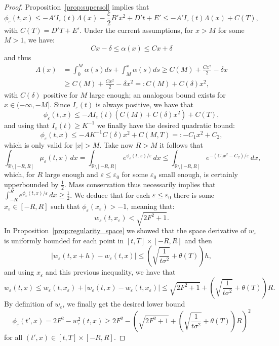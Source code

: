 \documentclass[onefignum,onetabnum]{siamart190516}
\newcommand{\R}{\mathbb{R}}
\newcommand{\1}{\mathbbm{1}}
\newcommand{\eps}{\varepsilon}
\begin{document}
\begin{proof}
Proposition~\ref{prop:supersol} implies that
$$
\phi_\eps(t,x)\leq -A'I_\eps(t)\Lambda(x)-\frac{\eps}{2}B'x^2+D't+E' \leq -A'I_\eps(t)\Lambda(x)+C(T),
$$
with $C(T)=D'T+E'$. Under the current assumptions, for $x>M$ for some $M>1$, we have:
$$
Cx-\delta\leq \alpha(x)\leq Cx+\delta
$$
and thus
\begin{align*}
\Lambda(x) & = \int_0^M\alpha(s)ds +\int_M^x\alpha(s)ds \geq C(M) + \frac{Cx^2}{2}-\delta x
\\
&\geq C(M)+ \frac{Cx^2}{2}-\delta x^2 =: C(M)+C(\delta)x^2,
\end{align*}
with $C(\delta)$ positive for $M$ large enough; an analogous bound exists for $x\in(-\infty,-M]$. Since $I_\eps(t)$ is always positive, we have that
$$
\phi_\eps(t,x) \leq -AI_\eps(t)(C(M)+C(\delta)x^2)+C(T),
$$
and using that $I_\eps(t)\geq K^{-1}$ we finally have the desired quadratic bound:
$$
\phi_\eps(t,x) \leq -AK^{-1}C(\delta)x^2+C(M,T)=: -C_1x^2+C_2,
$$
which is only valid for $\vert x\vert >M$. Take now $R>M$ it follows that
$$
\int_{\R\setminus [-R,R]} \mu_\eps(t,x)\,dx =\int_{\R\setminus [-R,R]}e^{\phi_\eps(t,x)/\eps}\,dx \leq \int_{\R\setminus [-R,R]}e^{-(C_1x^2-C_2)/\eps}\,dx,
$$
which, for $R$ large enough and $\eps\leq \eps_0$ for some $\eps_0$ small enough, is certainly upperbounded by $\frac 1 2$.
Mass conservation thus necessarily implies that $\int_{-R}^{R}e^{\phi_\eps(t,x)/\eps}\,dx\geq \frac12$. We deduce that for each $\eps\leq \eps_0$ there is some $x_\eps\in[-R,R]$ such that $\phi_\eps(x_{\eps})>-1$, meaning that:
$$
w_\eps(t,x_\eps)<\sqrt{2F^2+1}.
$$
In Proposition~\ref{prop:regularity_space} we showed that the space derivative of $w_\eps$ is uniformly bounded for each point in $[t,T]\times [-R,R]$ and then
$$
|w_\eps(t,x+h)-w_\eps(t,x)|\leq \left(\sqrt{\frac{1}{t\sigma^2}}+\theta(T)\right) h,
$$
and using $x_\eps$ and this previous inequality, we have that
$$
w_\eps(t,x) \leq w_\eps(t,x_\eps)+|w_\eps(t,x)-w_\eps(t,x_\eps)|\leq \sqrt{2F^2+1}+\left(\sqrt{\frac{1}{t\sigma^2}}+\theta(T)\right)R.
$$
By definition of $w_\eps$, we finally get the desired lower bound
$$
\phi_\eps(t',x) = 2F^2-w_\eps^2(t,x)\geq 2F^2-\left(\sqrt{2F^2+1}+\left(\sqrt{\frac{1}{t\sigma^2}}+\theta(T)\right)R\right)^2
$$
for all $(t',x)\in [t,T]\times[-R,R]$.
\end{proof}
\end{document}
